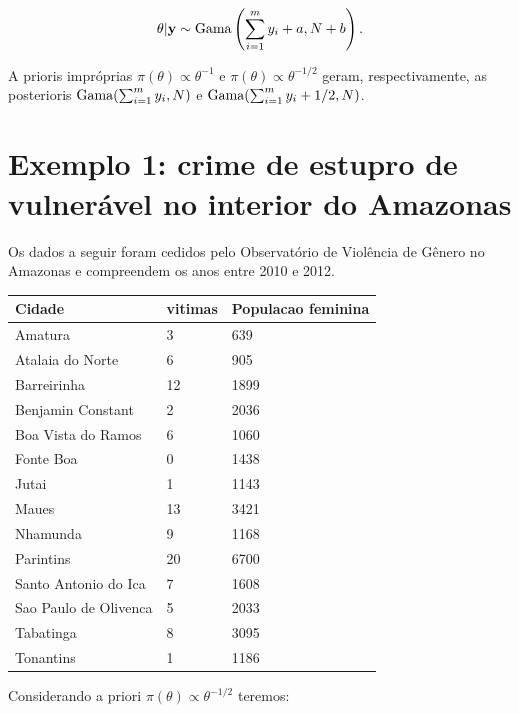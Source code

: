 \documentclass[
  letterpaper,
  DIV=11,
  numbers=noendperiod]{scrreprt}
\theoremstyle{definition}
\theoremstyle{definition}
\theoremstyle{remark}
\begin{document}
\[\theta|\mathbf{y}\sim\hbox{Gama}\left(\sum_{i=1}^{m}y_i+a,N+b\right).\]

A prioris impróprias \(\pi(\theta)\varpropto \theta^{-1}\) e
\(\pi(\theta)\varpropto \theta^{-1/2}\) geram, respectivamente, as
posterioris \(\hbox{Gama}(\sum_{i=1}^m y_i,N)\) e
\(\hbox{Gama}(\sum_{i=1}^m y_i+1/2,N)\).

\hypertarget{exemplo-1-crime-de-estupro-de-vulneruxe1vel-no-interior-do-amazonas}{%
\section{Exemplo 1: crime de estupro de vulnerável no interior do
Amazonas}\label{exemplo-1-crime-de-estupro-de-vulneruxe1vel-no-interior-do-amazonas}}

Os dados a seguir foram cedidos pelo Observatório de Violência de Gênero
no Amazonas e compreendem os anos entre 2010 e 2012.

\begin{longtable}[]{@{}lll@{}}
\toprule\noalign{}
Cidade & vitimas & Populacao feminina \\
\midrule\noalign{}
\endhead
\bottomrule\noalign{}
\endlastfoot
Amatura & 3 & 639 \\
Atalaia do Norte & 6 & 905 \\
Barreirinha & 12 & 1899 \\
Benjamin Constant & 2 & 2036 \\
Boa Vista do Ramos & 6 & 1060 \\
Fonte Boa & 0 & 1438 \\
Jutai & 1 & 1143 \\
Maues & 13 & 3421 \\
Nhamunda & 9 & 1168 \\
Parintins & 20 & 6700 \\
Santo Antonio do Ica & 7 & 1608 \\
Sao Paulo de Olivenca & 5 & 2033 \\
Tabatinga & 8 & 3095 \\
Tonantins & 1 & 1186 \\
\end{longtable}

Considerando a priori \(\pi(\theta)\varpropto \theta^{-1/2}\) teremos:
\end{document}
